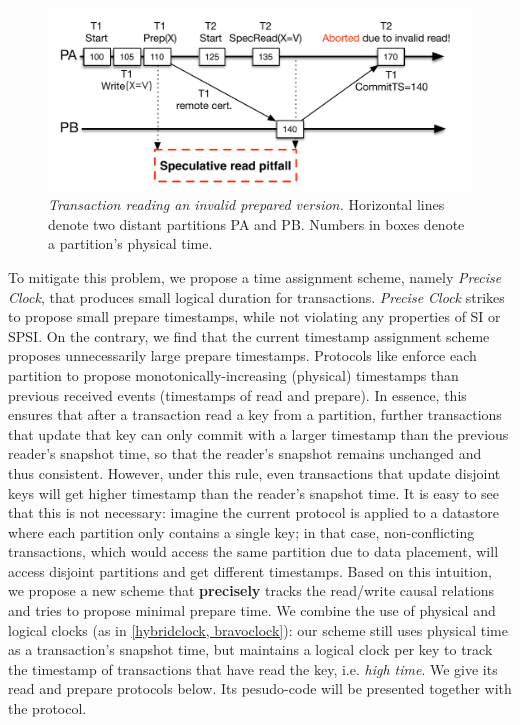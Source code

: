 \begin{figure}[tbh]
\centering
\hspace{-6mm}
\centering\includegraphics[scale = 0.48]{figures/SpeculativeRead}
\caption{\textit{Transaction reading an invalid prepared version.} Horizontal lines denote two distant partitions PA and PB. Numbers in boxes denote a partition's physical time.}
\label{fig:specula_read}
\end{figure}

To mitigate this problem, we propose a time assignment scheme, namely \textit{Precise Clock}, that produces small logical duration for transactions. \textit{Precise Clock} strikes to propose small prepare timestamps, while not violating any properties of SI or SPSI. On the contrary, we find that the current timestamp assignment scheme proposes unnecessarily large prepare timestamps. Protocols like \cite{clocksi, spanner} enforce each partition to propose monotonically-increasing (physical) timestamps than previous received events (timestamps of read and prepare). In essence, this ensures that after a transaction read a key from a partition, further transactions that update that key can only commit with a larger timestamp than the previous reader's snapshot time, so that the reader's snapshot remains unchanged and thus consistent. However, under this rule, even transactions that update disjoint keys will get higher timestamp than the reader's snapshot time. It is easy to see that this is not necessary: imagine the current protocol is applied to a datastore where each partition only contains a single key; in that case, non-conflicting transactions, which would access the same partition due to data placement, will access disjoint partitions and get different timestamps. Based on this intuition, we propose a new scheme that \textbf{precisely} tracks the read/write causal relations and tries to propose minimal prepare time. We combine the use of physical and logical clocks (as in \ref{hybridclock, bravoclock}): our scheme still uses physical time as a transaction's snapshot time, but maintains a logical clock per key to track the timestamp of transactions that have read the key, i.e. \textit{high time}. We give its read and prepare protocols below. Its pesudo-code will be presented together with the \specula protocol. 

 
